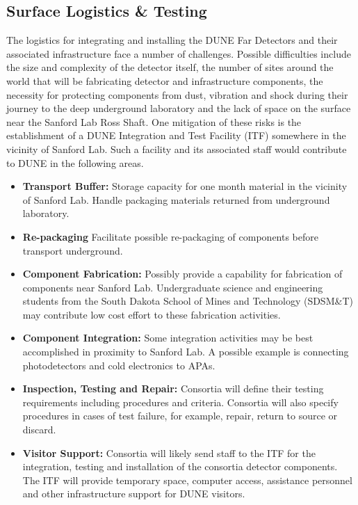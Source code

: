 \subsection{Surface Logistics \& Testing}
\label{sec:fdsp-coord-integ-test}

The logistics for integrating and installing the DUNE Far Detectors
and their associated infrastructure face a number of
challenges. Possible difficulties include the size and complexity of
the detector itself, the number of sites around the world that will be
fabricating detector and infrastructure components, the necessity for
protecting components from dust, vibration and shock during their
journey to the deep underground laboratory and the lack of space on
the surface near the Sanford Lab Ross Shaft. One mitigation
of these risks is the establishment of a DUNE
Integration and Test Facility (ITF) somewhere in the vicinity of
Sanford Lab. Such a facility and its associated staff would contribute
to DUNE in the following areas.
\begin{itemize}
  \item {\bf Transport Buffer:} Storage capacity for one month
    material in the vicinity of Sanford Lab. Handle packaging
    materials returned from underground laboratory.
  \item {\bf Re-packaging} Facilitate possible re-packaging of
    components before transport underground.
  \item {\bf Component Fabrication:} Possibly provide a capability for
    fabrication of components near Sanford Lab. Undergraduate science
    and engineering students from the South Dakota School of Mines and
    Technology (SDSM\&T) may contribute low cost effort to these
    fabrication activities.
  \item {\bf Component Integration:} Some integration activities may
    be best accomplished in proximity to Sanford Lab. A possible
    example is connecting photodetectors and cold electronics to APAs.
  \item {\bf Inspection, Testing and Repair:} Consortia will define
    their testing requirements including procedures and
    criteria. Consortia will also specify procedures in cases of test
    failure, for example, repair, return to source or discard.
  \item {\bf Visitor Support:} Consortia will likely send staff to the
    ITF for the integration, testing and installation of the consortia
    detector components. The ITF will provide temporary space,
    computer access, assistance personnel and other infrastructure
    support for DUNE visitors.
\end{itemize}

